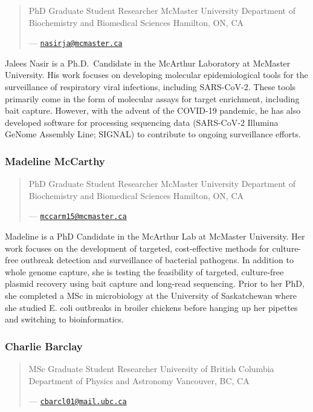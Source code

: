 \documentclass[
]{book}
\begin{document}
\begin{quote}
PhD Graduate Student Researcher
McMaster University
Department of Biochemistry and Biomedical Sciences
Hamilton, ON, CA

--- \href{mailto:nasirja@mcmaster.ca}{\nolinkurl{nasirja@mcmaster.ca}}
\end{quote}

Jalees Nasir is a Ph.D.~Candidate in the McArthur Laboratory at McMaster University. His work
focuses on developing molecular epidemiological tools for the surveillance of respiratory viral
infections, including SARS-CoV-2. These tools primarily come in the form of molecular assays
for target enrichment, including bait capture. However, with the advent of the COVID-19
pandemic, he has also developed software for processing sequencing data (SARS-CoV-2
Illumina GeNome Assembly Line; SIGNAL) to contribute to ongoing surveillance efforts.

\subsubsection{Madeline McCarthy}\label{madeline-mccarthy}

\begin{quote}
PhD Graduate Student Researcher
McMaster University
Department of Biochemistry and Biomedical Sciences
Hamilton, ON, CA

--- \href{mailto:mccarm15@mcmaster.ca}{\nolinkurl{mccarm15@mcmaster.ca}}
\end{quote}

Madeline is a PhD Candidate in the McArthur Lab at McMaster University. Her work focuses on
the development of targeted, cost-effective methods for culture-free outbreak detection and
surveillance of bacterial pathogens. In addition to whole genome capture, she is testing the
feasibility of targeted, culture-free plasmid recovery using bait capture and long-read
sequencing. Prior to her PhD, she completed a MSc in microbiology at the University of
Saskatchewan where she studied E. coli outbreaks in broiler chickens before hanging up her
pipettes and switching to bioinformatics.

\subsubsection{Charlie Barclay}\label{charlie-barclay}

\begin{quote}
MSc Graduate Student Researcher
University of British Columbia
Department of Physics and Astronomy
Vancouver, BC, CA

--- \href{mailto:cbarcl01@mail.ubc.ca}{\nolinkurl{cbarcl01@mail.ubc.ca}}
\end{quote}
\end{document}
